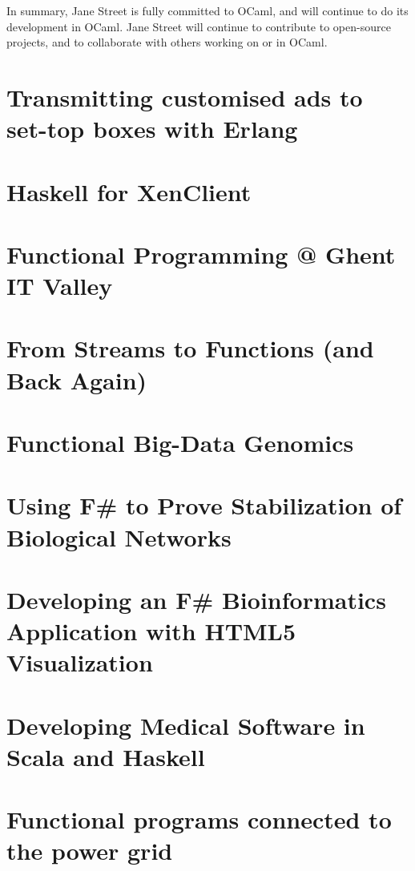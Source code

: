 \documentclass{jfp1}
\begin{document}
In summary, Jane Street is fully committed to OCaml, and will continue
to do its development in OCaml.  Jane Street will continue to
contribute to open-source projects, and to collaborate with others
working on or in OCaml.

\section{Transmitting customised ads to set-top boxes with Erlang}

\section{Haskell for XenClient}

\section{Functional Programming @ Ghent IT Valley}


\section{From Streams to Functions (and Back Again)}

\section{Functional Big-Data Genomics}

\section{Using F\# to Prove Stabilization of Biological Networks}

\section{Developing an F\# Bioinformatics Application with HTML5
  Visualization}

\section{Developing Medical Software in Scala and Haskell}

\section{Functional programs connected to the power grid}
\end{document}
